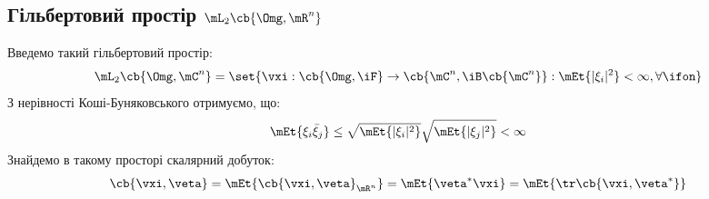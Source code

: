 \subsection{Гільбертовий простір $\mL_2\cb{\Omg,\mR^n}$}
Введемо такий гільбертовий простір:
\begin{equation}
\mL_2\cb{\Omg,\mC^n} = \set{\vxi:\cb{\Omg,\iF}\to\cb{\mC^n,\iB\cb{\mC^n}}:\mEt{|\xi_i|^2}<\infty,\forall\ifon}
\end{equation}
З нерівності Коші-Буняковського отримуємо, що:
\begin{equation}
\mEt{\xi_i\bar{\xi}_j}\leq \sqrt{\mEt{|\xi_i|^2}}\sqrt{\mEt{|\xi_j|^2}}< \infty
\end{equation}
Знайдемо в такому просторі скалярний добуток:
\begin{equation}\label{tr:3:2}
\cb{\vxi,\veta} = \mEt{\cb{\vxi,\veta}_{\mR^n}} = \mEt{\veta^\ast \vxi} = \mEt{\tr \cb{\vxi,\veta^\ast}}
\end{equation}
